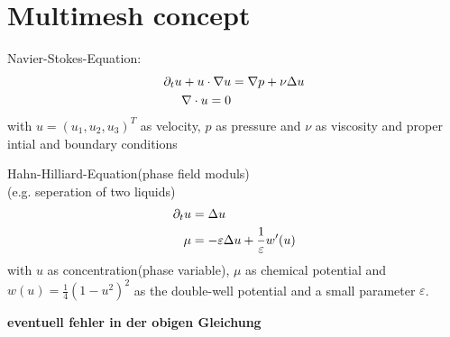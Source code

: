 \section{Multimesh concept}

\begin{example}
	Navier-Stokes-Equation:
	\begin{align*}
		\partial_t u + u \cdot \nabla u &= \nabla p + \nu \Delta u \\
		\nabla \cdot u = 0 
	\end{align*}
	with $u = (u_1,u_2,u_3)^T$ as velocity, $p$ as pressure and $\nu$ as viscosity and proper intial and boundary conditions
\end{example}

\begin{example}
	Hahn-Hilliard-Equation(phase field moduls)\\
	(e.g. seperation of two liquids)
	\begin{align*}
	\partial_t u &= \Delta u \\
	\mu &= -\varepsilon \Delta u + \frac{1}{\varepsilon}w'(u) 
	\end{align*}
	with $u$ as concentration(phase variable), $\mu$ as chemical potential and $w(u) = \frac{1}{4} (1-u^2)^2$ as the double-well potential and a small parameter $\varepsilon$.
	
\end{example}
\textbf{eventuell fehler in der obigen Gleichung}
